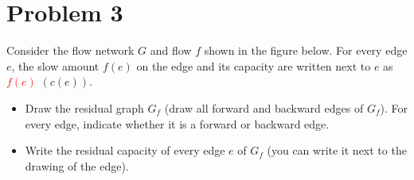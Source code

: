 \section{Problem 3}
Consider the flow network $G$ and flow $f$ shown in the figure below. For every edge $e$, the slow amount $f(e)$ on the edge and its capacity are written next to $e$ as \textcolor{red}{$f(e)$} $(c(e))$.
\begin{itemize}[$\bullet$]
    \item Draw the residual graph $G_f$ (draw all forward and backward edges of $G_f$). For every edge, indicate whether it is a forward or backward edge.
    \item Write the residual capacity of every edge $e$ of $G_f$ (you can write it next to the drawing of the edge).
\end{itemize}

